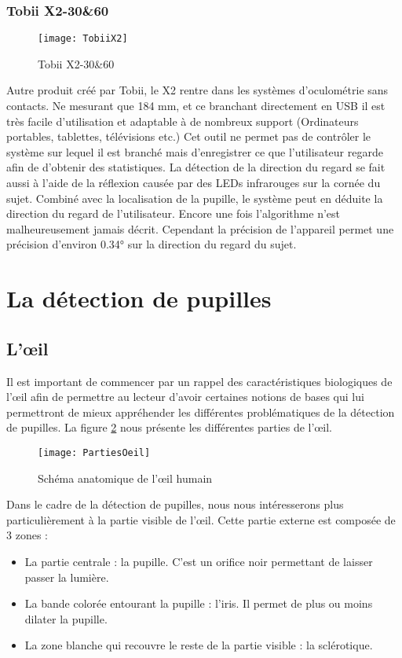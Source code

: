 \subsubsection{Tobii X2-30\&60}

\begin{figure}[h]
  \centering
  \texttt{[image: TobiiX2]}
  \caption{Tobii X2-30\&60}
  \label{fig:TobiiX2}
\end{figure}

Autre produit créé par Tobii, le X2 rentre dans les systèmes d’oculométrie sans contacts. Ne mesurant que 184 mm, et ce branchant directement en USB il est très facile d’utilisation et adaptable à  de nombreux support (Ordinateurs portables, tablettes, télévisions etc.)
Cet outil ne permet pas de contrôler le système sur lequel il est branché mais d’enregistrer ce que l’utilisateur regarde afin de d’obtenir des statistiques.
La détection de la direction du regard se fait aussi à l’aide de la réflexion causée par des LEDs infrarouges sur la cornée du sujet. Combiné avec la localisation de la pupille, le système peut en déduite la direction du regard de l’utilisateur. Encore une fois l’algorithme n’est malheureusement jamais décrit. Cependant la précision de l’appareil permet une précision d’environ 0.34° sur la direction du regard du sujet.

\section{La détection de pupilles}

\subsection{L’œil}

Il est important de commencer par un rappel des caractéristiques biologiques de l’œil afin de permettre au lecteur d’avoir certaines notions de bases qui lui permettront de mieux appréhender les différentes problématiques de la détection de pupilles.
La figure \ref{fig:PartiesOeil} nous présente les différentes parties de l’œil.

\begin{figure}[H]
  \centering
  \texttt{[image: PartiesOeil]}
  \caption{Schéma anatomique de l'œil humain}
  \label{fig:PartiesOeil}
\end{figure}

Dans le cadre de la détection de pupilles, nous nous intéresserons plus particulièrement à la partie visible de l’œil. Cette partie externe est composée de 3 zones :
\begin{itemize}[label=\textbullet,font=\color{black}]
\item La partie centrale : la pupille. C’est un orifice noir permettant de laisser passer la lumière.
\item La bande colorée entourant la pupille : l’iris. Il permet de plus ou moins dilater la pupille.
\item La zone blanche qui recouvre le reste de la partie visible : la sclérotique.
\end{itemize}

